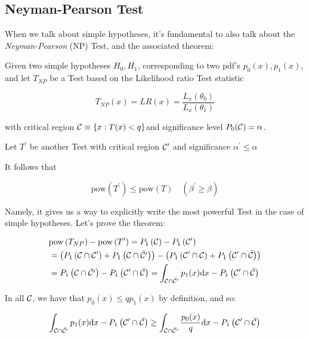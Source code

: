 \subsection{Neyman-Pearson Test}

When we talk about simple hypotheses, it's fundamental to also talk about the \emph{Neyman-Pearson} (NP) Test, and the associated theorem:

\begin{theorem}
	Given two simple hypotheses $H_0,H_1$, corresponding to two pdf's $p_0(x), p_1(x)$, and let $T_{NP}$ be a Test based on the Likelihood ratio Test statistic
	
	\[
	T_{NP}(x) = LR(x) = \frac{L_x(\theta_0)}{L_x(\theta_1)}
	\]
	
	with critical region $\mathcal{C}\equiv \{x: T(x)<q\}$\sidenotemark and significance level $P_0(\mathcal{C})=\alpha$.
	
	Let $T^\prime$ be another Test with critical region $\mathcal{C}^\prime$ and significance $\alpha^\prime\leq\alpha$ 
	
	It follows that 
	
	\[
	\text{pow}(T^\prime) \leq \text{pow}(T) \quad (\beta^\prime \geq \beta)
	\]
\end{theorem}

Namely, it gives us a way to explicitly write the most powerful Test in the case of simple hypotheses. Let's prove the theorem:

\begin{align*}
	&\text{pow}\left(T_{NP}\right) - \text{pow}\left(T^\prime\right) = P_1\left(\mathcal{C}\right) - P_1\left(\mathcal{C}^\prime\right)\\
	&= \left(P_1\left(\mathcal{C}\cap\mathcal{C}^\prime\right) + P_1\left(\mathcal{C}\cap\bar{\mathcal{C}^\prime}\right)\right) - \left(P_1\left(\mathcal{C}^\prime\cap\mathcal{C}\right) + P_1\left(\mathcal{C}^\prime\cap\bar{\mathcal{C}}\right)\right)\\
	&= P_1\left(\mathcal{C}\cap\bar{\mathcal{C}^\prime}\right) - P_1\left(\mathcal{C}^\prime\cap\bar{\mathcal{C}}\right) = \int_{\mathcal{C}\cap\bar{\mathcal{C}^\prime}} p_1(x)\mathrm{d} x - P_1\left(\mathcal{C}^\prime\cap\bar{\mathcal{C}}\right)
\end{align*}

In all $\mathcal{C}$, we have that $p_0(x) \leq qp_1(x)$ by definition, and so:
	
	\[
	\int_{\mathcal{C}\cap\bar{\mathcal{C}^\prime}} p_1(x)\mathrm{d} x - P_1\left(\mathcal{C}^\prime\cap\bar{\mathcal{C}}\right) \geq \int_{\mathcal{C}\cap\bar{\mathcal{C}^\prime}} \frac{p_0(x)}{q}\mathrm{d} x - P_1\left(\mathcal{C}^\prime\cap\bar{\mathcal{C}}\right)
	\]

